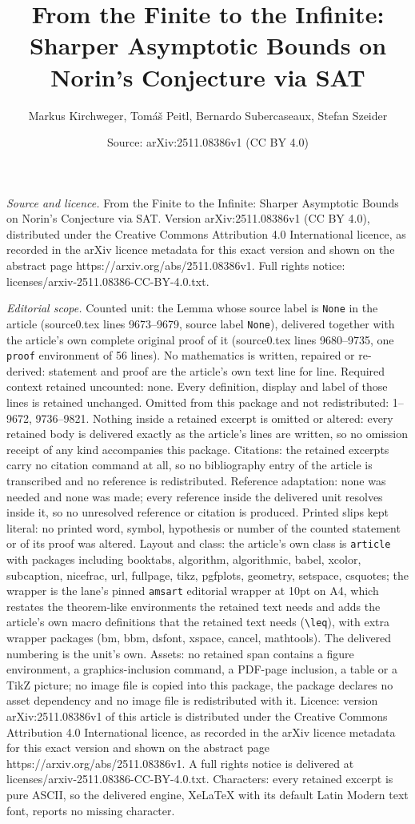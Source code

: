 \documentclass[10pt,a4paper]{amsart}
\title[From the Finite to the Infinite: Sharper Asymptotic Bounds o]{From the Finite to the Infinite: Sharper Asymptotic Bounds on Norin's Conjecture via SAT}
\author{Markus Kirchweger, Tom\'a\v{s} Peitl, Bernardo Subercaseaux, Stefan Szeider}
\date{Source: arXiv:2511.08386v1 (CC BY 4.0)}
\begin{document}
\maketitle

\noindent\emph{Source and licence.} From the Finite to the Infinite: Sharper Asymptotic Bounds on Norin's Conjecture via SAT. Version arXiv:2511.08386v1 (CC BY 4.0), distributed under the Creative Commons Attribution 4.0 International licence, as recorded in the arXiv licence metadata for this exact version and shown on the abstract page https://arxiv.org/abs/2511.08386v1. Full rights notice: licenses/arxiv-2511.08386-CC-BY-4.0.txt.\par\smallskip

\noindent\textit{Editorial scope.} Counted unit: the Lemma whose source label is \texttt{None} in the article (source0.tex lines 9673--9679, source label \texttt{None}), delivered together with the article's own complete original proof of it (source0.tex lines 9680--9735, one \texttt{proof} environment of 56 lines). No mathematics is written, repaired or re-derived: statement and proof are the article's own text line for line. Required context retained uncounted: none. Every definition, display and label of those lines is retained unchanged. Omitted from this package and not redistributed: 1--9672, 9736--9821. Nothing inside a retained excerpt is omitted or altered: every retained body is delivered exactly as the article's lines are written, so no omission receipt of any kind accompanies this package. Citations: the retained excerpts carry no citation command at all, so no bibliography entry of the article is transcribed and no reference is redistributed. Reference adaptation: none was needed and none was made; every reference inside the delivered unit resolves inside it, so no unresolved reference or citation is produced. Printed slips kept literal: no printed word, symbol, hypothesis or number of the counted statement or of its proof was altered. Layout and class: the article's own class is \texttt{article} with packages including booktabs, algorithm, algorithmic, babel, xcolor, subcaption, nicefrac, url, fullpage, tikz, pgfplots, geometry, setspace, csquotes; the wrapper is the lane's pinned \texttt{amsart} editorial wrapper at 10pt on A4, which restates the theorem-like environments the retained text needs and adds the article's own macro definitions that the retained text needs (\texttt{\textbackslash leq}), with extra wrapper packages (bm, bbm, dsfont, xspace, cancel, mathtools). The delivered numbering is the unit's own. Assets: no retained span contains a figure environment, a graphics-inclusion command, a PDF-page inclusion, a table or a TikZ picture; no image file is copied into this package, the package declares no asset dependency and no image file is redistributed with it. Licence: version arXiv:2511.08386v1 of this article is distributed under the Creative Commons Attribution 4.0 International licence, as recorded in the arXiv licence metadata for this exact version and shown on the abstract page https://arxiv.org/abs/2511.08386v1. A full rights notice is delivered at licenses/arxiv-2511.08386-CC-BY-4.0.txt. Characters: every retained excerpt is pure ASCII, so the delivered engine, XeLaTeX with its default Latin Modern text font, reports no missing character.
\end{document}
